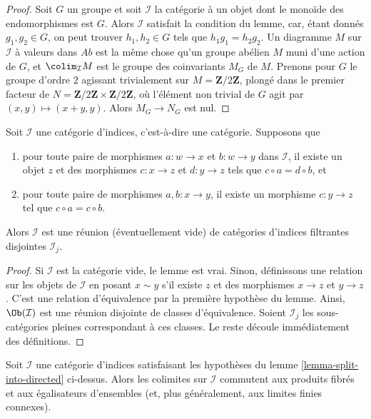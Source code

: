 \begin{proof}
\medskip\noindent
Soit $G$ un groupe et soit $\mathcal{I}$ la catégorie à un objet dont
le monoïde des endomorphismes est $G$. Alors $\mathcal{I}$ satisfait
la condition du lemme, car, étant donnés $g_1, g_2 \in G$, on peut trouver
$h_1, h_2 \in G$ tels que $h_1 g_1 = h_2 g_2$.
Un diagramme $M$ sur $\mathcal{I}$ à valeurs dans $\textit{Ab}$ est la même
chose qu'un groupe abélien $M$ muni d'une action de $G$, et
$\colim_\mathcal{I} M$ est le groupe des coinvariants $M_G$ de $M$.
Prenons pour $G$ le groupe d'ordre $2$ agissant trivialement sur
$M = \mathbf{Z}/2\mathbf{Z}$, plongé dans le premier facteur de
$N = \mathbf{Z}/2\mathbf{Z} \times \mathbf{Z}/2\mathbf{Z}$,
où l'élément non trivial de $G$ agit par
$(x, y) \mapsto (x + y, y)$. Alors $M_G \to N_G$ est nul.
\end{proof}

\begin{lemma}
\label{lemma-split-into-directed}
Soit $\mathcal{I}$ une catégorie d'indices, c'est-à-dire une catégorie.
Supposons que
\begin{enumerate}
\item pour toute paire de morphismes $a : w \to x$ et $b : w \to y$
dans $\mathcal{I}$, il existe un objet $z$ et des morphismes
$c : x \to z$ et $d : y \to z$ tels que $c \circ a = d \circ b$, et
\item pour toute paire de morphismes $a, b : x \to y$, il existe
un morphisme $c : y \to z$ tel que $c \circ a = c \circ b$.
\end{enumerate}
Alors $\mathcal{I}$ est une réunion (éventuellement vide)
de catégories d'indices filtrantes disjointes $\mathcal{I}_j$.
\end{lemma}

\begin{proof}
Si $\mathcal{I}$ est la catégorie vide, le lemme est vrai.
Sinon, définissons une relation sur les objets de $\mathcal{I}$ en posant
$x \sim y$ s'il existe $z$ et des morphismes
$x \to z$ et $y \to z$. C'est une relation d'équivalence
par la première hypothèse du lemme. Ainsi, $\Ob(\mathcal{I})$
est une réunion disjointe de classes d'équivalence. Soient
$\mathcal{I}_j$ les sous-catégories pleines correspondant à ces classes.
Le reste découle immédiatement des définitions.
\end{proof}

\begin{lemma}
\label{lemma-almost-directed-commutes-equalizers}
Soit $\mathcal{I}$ une catégorie d'indices satisfaisant les hypothèses du
lemme \ref{lemma-split-into-directed} ci-dessus. Alors les colimites sur
$\mathcal{I}$ commutent aux produits fibrés et aux égalisateurs d'ensembles
(et, plus généralement, aux limites finies connexes).
\end{lemma}

